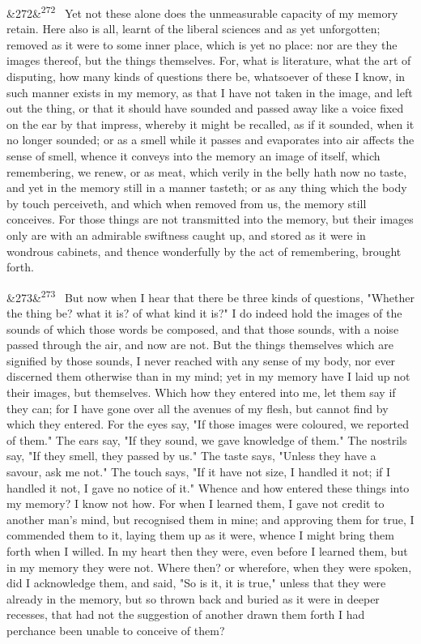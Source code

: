 \documentclass[12pt]{article}
\newcommand{\para}[1][]{\par\noindent\ifx&#1&\else\textsuperscript{\footnotesize #1}~\fi}
\begin{document}
\para[272] Yet not these alone does the unmeasurable capacity of my memory retain. Here also is all, learnt of the liberal sciences and as yet unforgotten; removed as it were to some inner place, which is yet no place: nor are they the images thereof, but the things themselves. For, what is literature, what the art of disputing, how many kinds of questions there be, whatsoever of these I know, in such manner exists in my memory, as that I have not taken in the image, and left out the thing, or that it should have sounded and passed away like a voice fixed on the ear by that impress, whereby it might be recalled, as if it sounded, when it no longer sounded; or as a smell while it passes and evaporates into air affects the sense of smell, whence it conveys into the memory an image of itself, which remembering, we renew, or as meat, which verily in the belly hath now no taste, and yet in the memory still in a manner tasteth; or as any thing which the body by touch perceiveth, and which when removed from us, the memory still conceives. For those things are not transmitted into the memory, but their images only are with an admirable swiftness caught up, and stored as it were in wondrous cabinets, and thence wonderfully by the act of remembering, brought forth.

\para[273] But now when I hear that there be three kinds of questions, "Whether the thing be? what it is? of what kind it is?" I do indeed hold the images of the sounds of which those words be composed, and that those sounds, with a noise passed through the air, and now are not. But the things themselves which are signified by those sounds, I never reached with any sense of my body, nor ever discerned them otherwise than in my mind; yet in my memory have I laid up not their images, but themselves. Which how they entered into me, let them say if they can; for I have gone over all the avenues of my flesh, but cannot find by which they entered. For the eyes say, "If those images were coloured, we reported of them." The ears say, "If they sound, we gave knowledge of them." The nostrils say, "If they smell, they passed by us." The taste says, "Unless they have a savour, ask me not." The touch says, "If it have not size, I handled it not; if I handled it not, I gave no notice of it." Whence and how entered these things into my memory? I know not how. For when I learned them, I gave not credit to another man's mind, but recognised them in mine; and approving them for true, I commended them to it, laying them up as it were, whence I might bring them forth when I willed. In my heart then they were, even before I learned them, but in my memory they were not. Where then? or wherefore, when they were spoken, did I acknowledge them, and said, "So is it, it is true," unless that they were already in the memory, but so thrown back and buried as it were in deeper recesses, that had not the suggestion of another drawn them forth I had perchance been unable to conceive of them?
\end{document}
